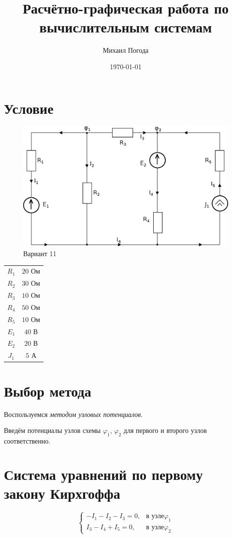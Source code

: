 \documentclass[a4paper,10pt,notitlepage,pdftex,headsepline]{scrartcl}
\author{Михаил Погода}
\title{Расчётно-графическая работа по вычислительным системам}
\date{\today}
\begin{document}
\maketitle

\section{Условие}

\begin{figure}[h]
\includegraphics[scale=0.75]{schema.eps}
\caption{Вариант 11}
\end{figure}

\begin{tabular}{cc}
$R_1$ & $20$ Ом\\
$R_2$ & $30$ Ом\\
$R_3$ & $10$ Ом\\
$R_4$ & $50$ Ом\\
$R_5$ & $10$ Ом\\
$E_1$ & $40$ В\\
$E_2$ & $20$ В\\
$J_1$ & $5$ А
\end{tabular}

\section{Выбор метода}
Воспользуемся \textit{методом узловых потенциалов}.

Введём потенциалы узлов схемы $\varphi_1$, $\varphi_2$ для первого и второго узлов соответственно.

\section{Система уравнений по первому закону Кирхгоффа}
$$
\begin{cases}
-I_1 - I_2 - I_3 = 0, & \text{в узле} \varphi_1\\
I_3 - I_4 + I_5 = 0, & \text{в узле} \varphi_2
\end{cases}
$$
\end{document}
